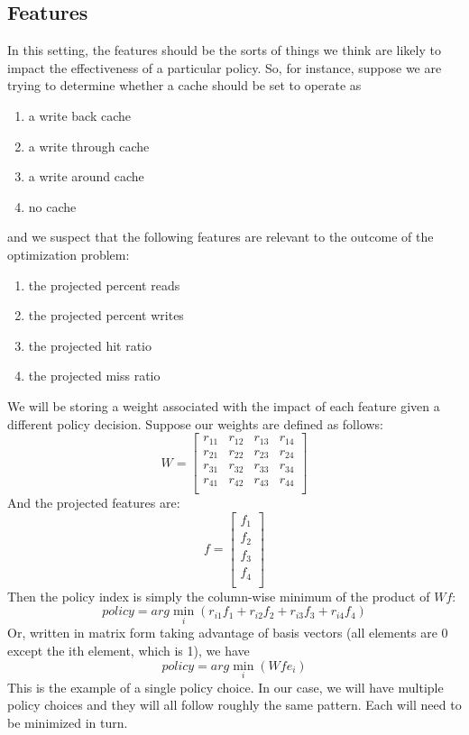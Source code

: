 \documentclass[11pt]{article}
\numberwithin{figure}{section}
\begin{document}
		\subsection{Features}
			In this setting, the features should be the sorts of things we think are likely to impact the effectiveness of a particular policy. So, for instance, suppose we are trying to determine whether a cache should be set to operate as
			\begin{enumerate}
				\item a write back cache
				\item a write through cache
				\item a write around cache
				\item no cache
			\end{enumerate}
			and we suspect that the following features are relevant to the outcome of the optimization problem:
			\begin{enumerate}
				\item the projected percent reads
				\item the projected percent writes
				\item the projected hit ratio
				\item the projected miss ratio
			\end{enumerate}
			We will be storing a weight associated with the impact of each feature given a different policy decision. Suppose our weights are defined as follows:
			$$
			W=
			\begin{bmatrix}
			r_{11}&r_{12}&r_{13}&r_{14}\\
			r_{21}&r_{22}&r_{23}&r_{24}\\
			r_{31}&r_{32}&r_{33}&r_{34}\\
			r_{41}&r_{42}&r_{43}&r_{44}\\
			\end{bmatrix}
			$$
			And the projected features are:
			$$
			f=
			\begin{bmatrix}
			f_{1}\\
			f_{2}\\
			f_{3}\\
			f_{4}\\
			\end{bmatrix}
			$$
			Then the policy index is simply the column-wise minimum of the product of \begin{math}Wf\end{math}:
			\begin{equation}
			policy = arg\min_i (r_{i1} f_1+r_{i2} f_2 + r_{i3} f_3 + r_{i4} f_4)
			\end{equation}
			Or, written in matrix form taking advantage of basis vectors (all elements are 0 except the ith element, which is 1), we have
			\begin{equation}
			policy = arg\min_i(Wfe_i)
			\end{equation}
			This is the example of a single policy choice. In our case, we will have multiple policy choices and they will all follow roughly the same pattern. Each will need to be minimized in turn.
\end{document}
